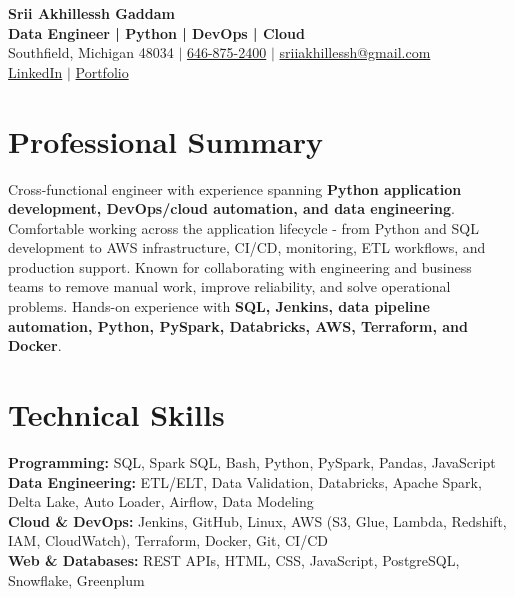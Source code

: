 \documentclass[letterpaper,10pt]{article}
\begin{document}
\fontsize{9.35pt}{10.45pt}\selectfont

\begin{center}
    {\LARGE \textbf{Srii Akhillessh Gaddam}} \\[-1pt]
    \textbf{Data Engineer | Python | DevOps | Cloud} \\[2pt]
    Southfield, Michigan 48034 $|$
    \href{tel:6468752400}{646-875-2400} $|$
    \href{mailto:sriiakhillessh@gmail.com}{sriiakhillessh@gmail.com} \\[1pt]
    \href{https://www.linkedin.com/in/srii-akhiilessh-gaddam-b48668191/}{LinkedIn} $|$
    \href{https://sriiakhillesshg.github.io/portfolio/}{Portfolio}
\end{center}
\vspace{-8pt}

\section{Professional Summary}
\small{Cross-functional engineer with experience spanning \textbf{Python application development, DevOps/cloud automation, and data engineering}. Comfortable working across the application lifecycle - from Python and SQL development to AWS infrastructure, CI/CD, monitoring, ETL workflows, and production support. Known for collaborating with engineering and business teams to remove manual work, improve reliability, and solve operational problems. Hands-on experience with \textbf{SQL, Jenkins, data pipeline automation, Python, PySpark, Databricks, AWS, Terraform, and Docker}.}

\section{Technical Skills}
\small{
\textbf{Programming:} SQL, Spark SQL, Bash, Python, PySpark, Pandas, JavaScript \\
\textbf{Data Engineering:} ETL/ELT, Data Validation, Databricks, Apache Spark, Delta Lake, Auto Loader, Airflow, Data Modeling \\
\textbf{Cloud \& DevOps:} Jenkins, GitHub, Linux, AWS (S3, Glue, Lambda, Redshift, IAM, CloudWatch), Terraform, Docker, Git, CI/CD \\
\textbf{Web \& Databases:} REST APIs, HTML, CSS, JavaScript, PostgreSQL, Snowflake, Greenplum
}

\end{document}
